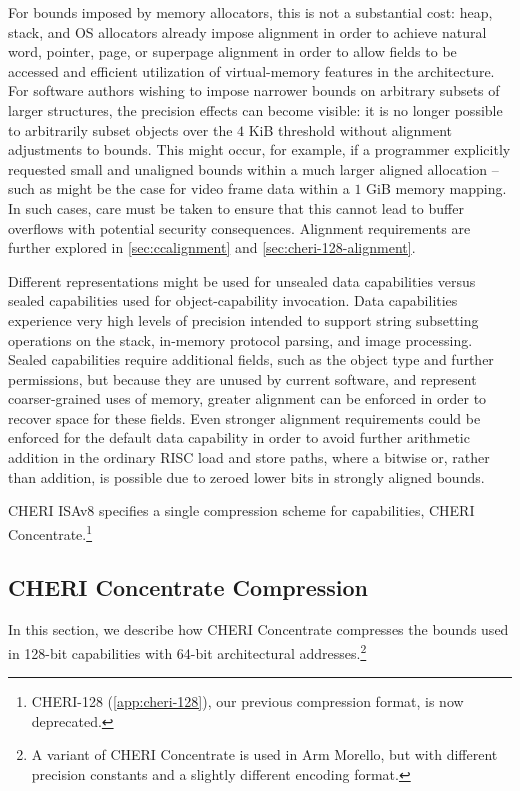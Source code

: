 For bounds imposed by memory allocators, this is not a substantial cost:
heap, stack, and OS allocators already impose alignment in order to achieve
natural word, pointer, page, or superpage alignment in order to allow fields
to be accessed and efficient utilization of virtual-memory features in the
architecture.
For software authors wishing to impose narrower bounds on arbitrary subsets of
larger structures, the precision effects can become visible: it is no longer
possible to arbitrarily subset objects over the $4$ KiB threshold without
alignment adjustments to bounds.
This might occur, for example, if a programmer explicitly requested small and
unaligned bounds within a much larger aligned allocation -- such as might be
the case for video frame data within a $1$ GiB memory mapping.
In such cases, care must be taken to ensure that this cannot lead to buffer
overflows with potential security consequences.  Alignment
requirements are further explored in \cref{sec:ccalignment} and \cref{sec:cheri-128-alignment}.

Different representations might be used for unsealed data capabilities versus
sealed capabilities used for object-capability invocation.
Data capabilities experience very high levels of precision intended to support
string subsetting operations on the stack, in-memory protocol parsing, and
image processing.
Sealed capabilities require additional fields, such as the object type and
further permissions, but because they are unused by current software, and
represent coarser-grained uses of memory, greater alignment can be enforced in
order to recover space for these fields.
Even stronger alignment requirements could be enforced for the default data
capability in order to avoid further arithmetic addition in the ordinary RISC
load and store paths, where a bitwise or, rather than addition, is possible
due to zeroed lower bits in strongly aligned bounds.

CHERI ISAv8 specifies a single compression scheme for capabilities,
CHERI Concentrate.\footnote{CHERI-128 (\cref{app:cheri-128}), our previous
compression format, is now deprecated.}

\subsection{CHERI Concentrate Compression}
\label{subsec:cheri-concentrate}

In this section, we describe how CHERI Concentrate compresses the bounds used
in 128-bit capabilities with 64-bit architectural addresses.\footnote{A
variant of CHERI Concentrate is used in Arm Morello, but with different
precision constants and a slightly different encoding format.}

